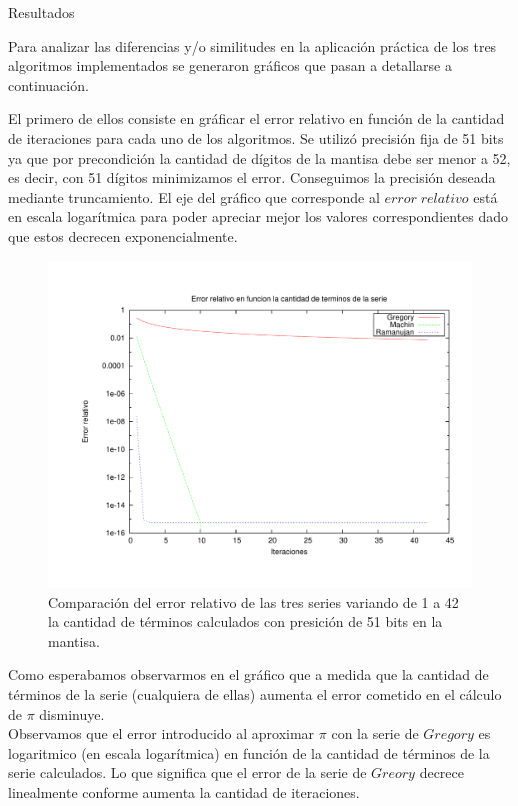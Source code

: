 \begin{section}{Resultados}

	Para analizar las diferencias y/o similitudes en la aplicación práctica de los tres algoritmos implementados se generaron gráficos que pasan a detallarse a continuación. 
		
	El primero de ellos consiste en gráficar el error relativo en función de la cantidad de iteraciones para cada uno de los algoritmos. Se utilizó precisión fija de 51 bits ya que por precondición la cantidad de dígitos de la mantisa debe ser menor a 52, es decir, con 51 dígitos minimizamos el error. Conseguimos la precisión deseada mediante truncamiento.
	El eje del gráfico que corresponde al $error\;relativo$ está en escala logarítmica para poder apreciar mejor los valores correspondientes dado que estos decrecen exponencialmente.

	\begin{figure}[H]
	  \centering
		\includegraphics[width=14cm]{graficos/comparacion_1a42it_51p.pdf}
	  \caption{Comparación del error relativo de las tres series variando de 1 a 42 la cantidad de términos calculados con presición de 51 bits en la mantisa.}
	  \label{fig:51p}
	\end{figure}
	
	\VSP

	Como esperabamos observarmos en el gráfico que a medida que la cantidad de términos de la serie (cualquiera de ellas) aumenta el error cometido en el cálculo de $\pi$ disminuye.\\
	
	Observamos que el error introducido al aproximar $\pi$ con la serie de $Gregory$ es logaritmico (en escala logarítmica) en función de la cantidad de términos de la serie calculados. Lo que significa que el error de la serie de $Greory$ decrece linealmente conforme aumenta la cantidad de iteraciones.
	

\end{section}
